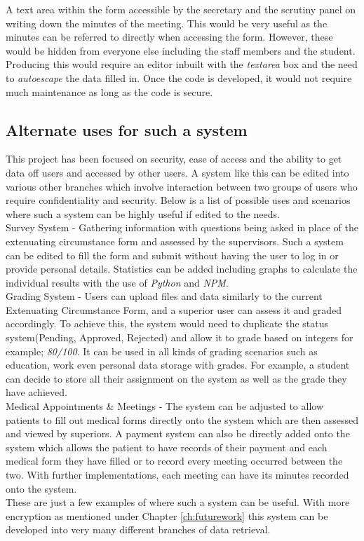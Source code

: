 \documentclass[../main.tex]{subfiles}
\begin{document}
A text area within the form accessible by the secretary and the scrutiny panel on writing down the minutes of the meeting. This would be very useful as the minutes can be referred to directly when accessing the form. However, these would be hidden from everyone else including the staff members and the student. Producing this would require an editor inbuilt with the \textit{textarea} box and the need to \textit{autoescape} the data filled in. Once the code is developed, it would not require much maintenance as long as the code is secure. 

\subsection*{Alternate uses for such a system}
This project has been focused on security, ease of access and the ability to get data off users and accessed by other users. A system like this can be edited into various other branches which involve interaction between two groups of users who require confidentiality and security. Below is a list of possible uses and scenarios where such a system can be highly useful if edited to the needs.\\[4mm]
 
Survey System - Gathering information with questions being asked in place of the extenuating circumstance form and assessed by the supervisors. Such a system can be edited to fill the form and submit without having the user to log in or provide personal details. Statistics can be added including graphs to calculate the individual results with the use of \textit{Python} and \textit{NPM}. \\[4mm]

Grading System - Users can upload files and data similarly to the current Extenuating Circumstance Form, and a superior user can assess it and graded accordingly. To achieve this, the system would need to duplicate the status system(Pending, Approved, Rejected) and allow it to grade based on integers for example; \textit{80/100}. It can be used in all kinds of grading scenarios such as education, work even personal data storage with grades. For example, a student can decide to store all their assignment on the system as well as the grade they have achieved. \\[4mm]

Medical Appointments \& Meetings - The system can be adjusted to allow patients to fill out medical forms directly onto the system which are then assessed and viewed by superiors. A payment system can also be directly added onto the system which allows the patient to have records of their payment and each medical form they have filled or to record every meeting occurred between the two. With further implementations, each meeting can have its minutes recorded onto the system.\\[4mm]

These are just a few examples of where such a system can be useful. With more encryption as mentioned under Chapter \ref{ch:futurework} this system can be developed into very many different branches of data retrieval.
\end{document}
